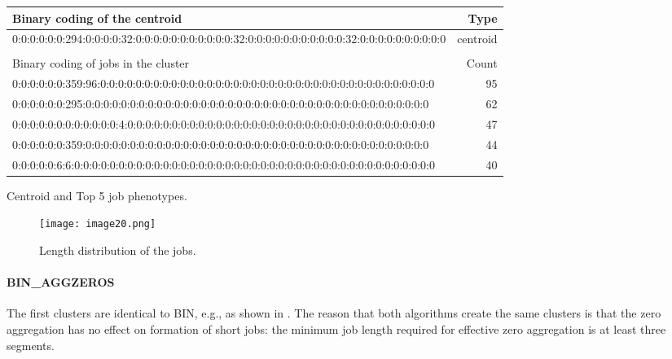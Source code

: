 \documentclass{jhps}
\begin{document}
\begin{minipage}{\textwidth}
\begingroup
  \begin{subtable}{\textwidth}
  \centering
  \begin{tiny}
    \begin{tabular}{l|r}
      \rowcolor{tblhead}
      Binary coding of the centroid                                                                    &  Type     \\ 
      \hline
      0:0:0:0:0:0:294:0:0:0:0:32:0:0:0:0:0:0:0:0:0:0:0:32:0:0:0:0:0:0:0:0:0:0:0:32:0:0:0:0:0:0:0:0:0:0 &  centroid \\ 
      \multicolumn{2}{l}{}                                                                             \\ 
      \rowcolor{tblhead}
      Binary coding of jobs in the cluster                                                             &  Count    \\ 
      \hline
      0:0:0:0:0:0:359:96:0:0:0:0:0:0:0:0:0:0:0:0:0:0:0:0:0:0:0:0:0:0:0:0:0:0:0:0:0:0:0:0:0:0:0:0:0:0   &  95       \\ 
      0:0:0:0:0:0:295:0:0:0:0:0:0:0:0:0:0:0:0:0:0:0:0:0:0:0:0:0:0:0:0:0:0:0:0:0:0:0:0:0:0:0:0:0:0:0    &  62       \\ 
      0:0:0:0:0:0:0:0:0:0:0:0:4:0:0:0:0:0:0:0:0:0:0:0:0:0:0:0:0:0:0:0:0:0:0:0:0:0:0:0:0:0:0:0:0:0:0:0  &  47       \\ 
      0:0:0:0:0:0:359:0:0:0:0:0:0:0:0:0:0:0:0:0:0:0:0:0:0:0:0:0:0:0:0:0:0:0:0:0:0:0:0:0:0:0:0:0:0:0    &  44       \\ 
      0:0:0:0:0:6:6:0:0:0:0:0:0:0:0:0:0:0:0:0:0:0:0:0:0:0:0:0:0:0:0:0:0:0:0:0:0:0:0:0:0:0:0:0:0:0:0:0  &  40       \\ 
    \end{tabular}
  \end{tiny}
  \caption{Centroid and Top 5 job phenotypes.}
  \label{tab:bin_all:top_jobs}
  \end{subtable}
\endgroup

\medskip

\begingroup
  \begin{subfigure}{\textwidth}
  \centering
  \texttt{[image: image20.png]}
  \caption{Length distribution of the jobs.}
  \label{fig:bin_all:length}
  \end{subfigure}
\endgroup

\label{fig:bin_all}
\end{minipage}

\paragraph{BIN\_AGGZEROS}
The first clusters are identical to BIN, e.g., as shown in .
The reason that both algorithms create the same clusters is that the zero aggregation has no effect on formation of short jobs: the minimum job length required for effective zero aggregation is at least three segments.
\end{document}
